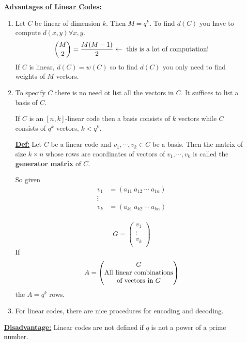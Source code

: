 \documentclass{article}
\renewcommand{\b}[1]{\textbf{#1}}
\newcommand{\ul}[1]{\underline{#1}}
\renewcommand{\aligned}[1]{
	\begin{align*}
		#1
	\end{align*}
}
\newcommand{\newdef}[2]{\b{\ul{#1:}} #2}
\begin{document}
\newdef{Advantages of Linear Codes}{
	\begin{enumerate}
		\item Let $C$ be linear of dimension $k$. Then $M = q^k$. To
		      find $d(C)$ you have to compute $d(x, y) \forall x, y$.
		      \[
			      \binom{M}{2} = \frac{M(M-1)}{2} \leftarrow
			      \textnormal{ this is a lot of computation!}
		      \]
		      If $C$ is linear, $d(C) = w(C)$ so to find $d(C)$ you
		      only need to find weights of $M$ vectors.
		\item To specify $C$ there is no need ot list all the vectors
		      in $C$. It suffices to list a basis of $C$.

		      If $C$ is an $[n, k]$-linear code then a basis consists
		      of $k$ vectors while $C$ consists of $q^k$ vectors,
		      $k < q^k$.

		      \newdef{Def}{
			      Let $C$ be a linear code and $v_1, \cdots, v_k
				      \in C$ be a basis. Then the matrix of
			      size $k \times n$ whose rows are coordinates of
			      vectors of $v_1, \cdots, v_k$ is called the
			      \b{generator matrix} of $C$.

			      So given \aligned{
				      v_1    & = (a_{11}\ a_{12}\ \cdots\ a_{1n}) \\
				      \vdots &                                    \\
				      v_k    & = (a_{k1}\ a_{k2}\ \cdots\ a_{kn}) \\
			      }
			      \[
				      G = \begin{pmatrix}
					      v_1    \\
					      \vdots \\
					      v_k    \\
				      \end{pmatrix}
			      \]
			      If \[A = \begin{pmatrix}
					      G                                    \\
					      \textnormal{All linear combinations} \\
					      \textnormal{of vectors in } G        \\
				      \end{pmatrix}
			      \]
			      the $A = q^k$ rows.
		      }
		\item For linear codes, there are nice procedures for encoding
		      and decoding.
	\end{enumerate}
}

\newdef{Disadvantage}{
	Linear codes are not defined if $q$ is not a power of a prime number.
}
\end{document}
